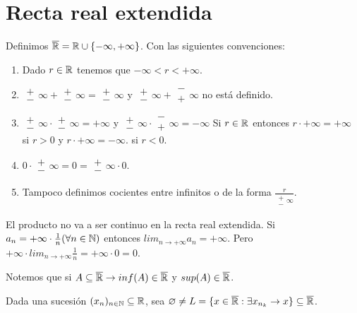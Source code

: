 \section{Recta real extendida}

\begin{definition}
    Definimos $\overline{\mathbb{R}} = \mathbb{R} \cup \{ -\infty, +\infty \}$. Con las siguientes convenciones:
    \begin{enumerate}
        \item Dado $r \in \mathbb{R}$ tenemos que $-\infty < r < +\infty$.
        \item $\substack{+ \\ -} \infty + \substack{+ \\ -} \infty = \substack{+ \\ -} \infty$ y
        $\substack{+ \\ -} \infty + \substack{- \\ +} \infty$ no está definido. 
        \item $\substack{+ \\ -} \infty \cdot \substack{+ \\ -} \infty = +\infty$ y
        $\substack{+ \\ -} \infty \cdot \substack{- \\ +} \infty = -\infty$
        Si $r \in \mathbb{R}$ entonces $r \cdot +\infty = +\infty$ si $r > 0$ y $r \cdot +\infty = -\infty$. si $r < 0$.
        \item $0 \cdot \substack{+ \\ -} \infty = 0 = \substack{+ \\ -} \infty \cdot 0$.
        \item Tampoco definimos cocientes entre infinitos o de la forma $\frac{r}{\substack{+ \\ -} \infty}$.
    \end{enumerate}
\end{definition}

\begin{note}
    El producto no va a ser continuo en la recta real extendida.
    Si $a_n = +\infty \cdot \frac{1}{n} (\forall n \in \mathbb{N})$ entonces $lim_{n \to +\infty} a_n = +\infty$. Pero $+\infty \cdot lim_{n \to +\infty} \frac{1}{n} = +\infty \cdot 0 = 0$. 
\end{note}

Notemos que si $A \subseteq \overline{\mathbb{R}} \to inf(A) \in \overline{\mathbb{R}}$ y $sup(A) \in \overline{\mathbb{R}}$.

Dada una sucesión $(x_n)_{n \in \mathbb{N}} \subseteq \mathbb{R}$, sea $\varnothing \neq L = \{ x \in \overline{\mathbb{R}} : \exists x_{n_k} \to x \} \subseteq \overline{\mathbb{R}}$.

